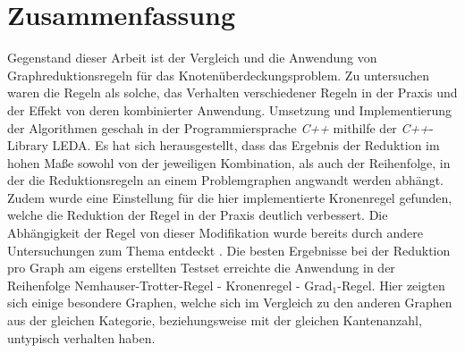 \chapter*{Zusammenfassung}
Gegenstand dieser Arbeit ist der Vergleich und die Anwendung von Graphreduktionsregeln für das Knotenüberdeckungsproblem. Zu untersuchen waren die Regeln als solche, das Verhalten verschiedener Regeln in der Praxis und der Effekt von deren kombinierter Anwendung. Umsetzung und Implementierung der Algorithmen geschah in der Programmiersprache \emph{C++} mithilfe der \emph{C++}-Library LEDA. Es hat sich herausgestellt, dass das Ergebnis der Reduktion im hohen Maße sowohl von der jeweiligen Kombination, als auch der Reihenfolge, in der die Reduktionsregeln an einem Problemgraphen angwandt werden abhängt. Zudem wurde eine Einstellung für die hier implementierte Kronenregel gefunden, welche die Reduktion der Regel in der Praxis deutlich verbessert. Die Abhängigkeit der Regel von dieser Modifikation wurde bereits durch andere Untersuchungen zum Thema entdeckt \cite{paper:7}. Die besten Ergebnisse bei der Reduktion pro Graph am eigens erstellten Testset erreichte die Anwendung in der Reihenfolge Nemhauser-Trotter-Regel - Kronenregel - Grad$_{1}$-Regel. Hier zeigten sich einige besondere Graphen, welche sich im Vergleich zu den anderen Graphen aus der gleichen Kategorie, beziehungsweise mit der gleichen Kantenanzahl, untypisch verhalten haben. 
